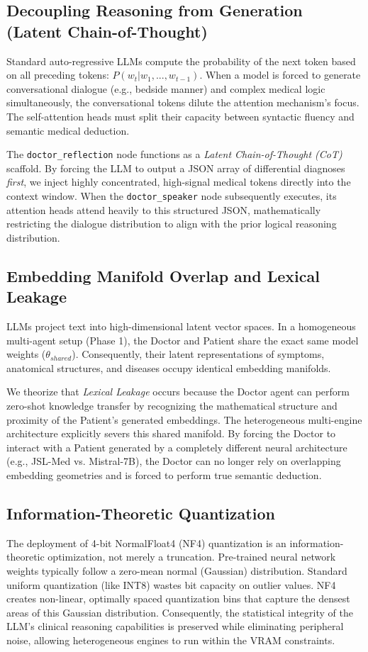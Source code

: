 \documentclass[12pt, a4paper, twoside]{report}
\begin{document}
\subsection{Decoupling Reasoning from Generation (Latent Chain-of-Thought)}
Standard auto-regressive LLMs compute the probability of the next token based on all preceding tokens: $P(w_t | w_1, ..., w_{t-1})$. When a model is forced to generate conversational dialogue (e.g., bedside manner) and complex medical logic simultaneously, the conversational tokens dilute the attention mechanism's focus. The self-attention heads must split their capacity between syntactic fluency and semantic medical deduction.

The \texttt{doctor\_reflection} node functions as a \textit{Latent Chain-of-Thought (CoT)} scaffold. By forcing the LLM to output a JSON array of differential diagnoses \textit{first}, we inject highly concentrated, high-signal medical tokens directly into the context window. When the \texttt{doctor\_speaker} node subsequently executes, its attention heads attend heavily to this structured JSON, mathematically restricting the dialogue distribution to align with the prior logical reasoning distribution.

\subsection{Embedding Manifold Overlap and Lexical Leakage}
LLMs project text into high-dimensional latent vector spaces. In a homogeneous multi-agent setup (Phase 1), the Doctor and Patient share the exact same model weights ($\theta_{shared}$). Consequently, their latent representations of symptoms, anatomical structures, and diseases occupy identical embedding manifolds. 

We theorize that \textit{Lexical Leakage} occurs because the Doctor agent can perform zero-shot knowledge transfer by recognizing the mathematical structure and proximity of the Patient's generated embeddings. The heterogeneous multi-engine architecture explicitly severs this shared manifold. By forcing the Doctor to interact with a Patient generated by a completely different neural architecture (e.g., JSL-Med vs. Mistral-7B), the Doctor can no longer rely on overlapping embedding geometries and is forced to perform true semantic deduction.

\subsection{Information-Theoretic Quantization}
The deployment of 4-bit NormalFloat4 (NF4) quantization is an information-theoretic optimization, not merely a truncation. Pre-trained neural network weights typically follow a zero-mean normal (Gaussian) distribution. Standard uniform quantization (like INT8) wastes bit capacity on outlier values. NF4 creates non-linear, optimally spaced quantization bins that capture the densest areas of this Gaussian distribution. Consequently, the statistical integrity of the LLM's clinical reasoning capabilities is preserved while eliminating peripheral noise, allowing heterogeneous engines to run within the VRAM constraints.
\end{document}
